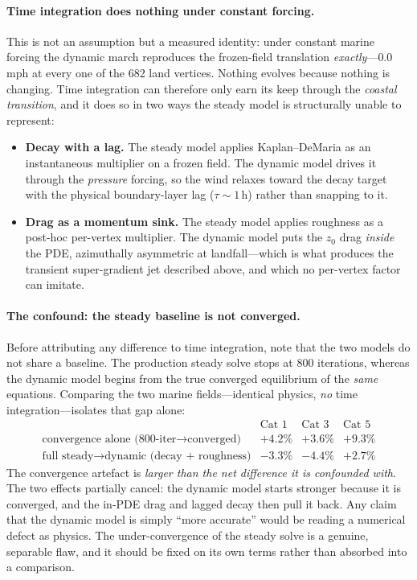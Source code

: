 \documentclass[11pt]{article}
\begin{document}
\paragraph{Time integration does nothing under constant forcing.} This is not an
assumption but a measured identity: under constant marine forcing the dynamic march
reproduces the frozen-field translation \emph{exactly}---$0.0$\,mph at every one of the
682 land vertices. Nothing evolves because nothing is changing. Time integration can
therefore only earn its keep through the \emph{coastal transition}, and it does so in
two ways the steady model is structurally unable to represent:
\begin{itemize}
\item \textbf{Decay with a lag.} The steady model applies Kaplan--DeMaria as an
instantaneous multiplier on a frozen field. The dynamic model drives it through the
\emph{pressure} forcing, so the wind relaxes toward the decay target with the physical
boundary-layer lag ($\tau\!\sim\!1$\,h) rather than snapping to it.
\item \textbf{Drag as a momentum sink.} The steady model applies roughness as a
post-hoc per-vertex multiplier. The dynamic model puts the $z_0$ drag \emph{inside} the
PDE, azimuthally asymmetric at landfall---which is what produces the transient
super-gradient jet described above, and which no per-vertex factor can imitate.
\end{itemize}

\paragraph{The confound: the steady baseline is not converged.} Before attributing any
difference to time integration, note that the two models do not share a baseline. The
production steady solve stops at 800 iterations, whereas the dynamic model begins from
the true converged equilibrium of the \emph{same} equations. Comparing the two marine
fields---identical physics, \emph{no} time integration---isolates that gap alone:
\[
\begin{array}{lccc}
 & \text{Cat 1} & \text{Cat 3} & \text{Cat 5}\\\hline
\text{convergence alone (800-iter} \to \text{converged)} & +4.2\% & +3.6\% & +9.3\%\\
\text{full steady} \to \text{dynamic (decay + roughness)} & -3.3\% & -4.4\% & +2.7\%
\end{array}
\]
The convergence artefact is \emph{larger than the net difference it is confounded with}.
The two effects partially cancel: the dynamic model starts stronger because it is
converged, and the in-PDE drag and lagged decay then pull it back. Any claim that the
dynamic model is simply ``more accurate'' would be reading a numerical defect as
physics. The under-convergence of the steady solve is a genuine, separable flaw, and it
should be fixed on its own terms rather than absorbed into a comparison.
\end{document}
